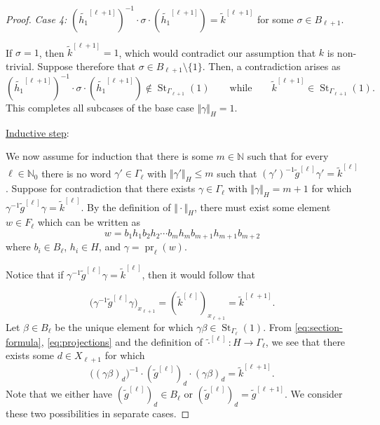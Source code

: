 \documentclass[10pt,a4paper]{amsart}
\DeclareMathOperator{\St}{St}
\DeclareMathOperator{\pr}{pr}
\newcommand{\N}{\mathbb{N}}
\newcommand{\absH}[1]{\Vert #1 \Vert_H}
\renewcommand\leq\leqslant
\begin{document}
\begin{proof}
\medskip

\noindent\textit{Case 4:}
$(\widetilde{h_1}^{[\ell+1]})^{-1}\cdot \sigma\cdot (\widetilde{h_1}^{[\ell+1]}) = \widetilde{k}^{[\ell+1]}$ for some $\sigma\in B_{\ell+1}$.

\smallskip\noindent
If $\sigma = 1$, then $\widetilde{k}^{[\ell+1]} = 1$, which would contradict our assumption that $k$ is non-trivial.
Suppose therefore that $\sigma \in B_{\ell+1}\setminus \{1\}$.
Then, a contradiction arises as
\[									 
(\widetilde{h_1}^{[\ell+1]})^{-1}\cdot \sigma\cdot (\widetilde{h_1}^{[\ell+1]})\notin \St_{\Gamma_{\ell+1}}(1)
\qquad
\text{while}
\qquad
\widetilde{k}^{[\ell+1]}\in \St_{\Gamma_{\ell+1}}(1).
\]
This completes all subcases of the base case $\absH{\gamma}=1$.

\medskip

\noindent\underline{Inductive step}:
\nopagebreak

\nopagebreak\smallskip
\nopagebreak\noindent
We now assume for induction that there is some $m\in \N$ such that for every $\ell\in\N_0$ there is no word $\gamma'\in\Gamma_\ell$ with $\absH{\gamma'}\leq m$ such that $(\gamma')^{-1} \widetilde{g}^{[\ell]} \gamma' = \widetilde{k}^{[\ell]}$.
Suppose for contradiction that there exists $\gamma\in \Gamma_\ell$ with $\absH{\gamma}=m+1$ for which $\gamma^{-1} \widetilde{g}^{[\ell]} \gamma = \widetilde{k}^{[\ell]}$.
By the definition of $\absH{\cdot}$, there must exist some element $w\in F_\ell$ which can be written as
\[
    w = b_1 h_1 b_2 h_2 \cdots b_m h_m b_{m+1} h_{m+1} b_{m+2} 
\]
where $b_i\in B_\ell$, $h_i\in H$, and $\gamma = \pr_\ell(w)$.

Notice that if $\gamma^{-1} \widetilde{g}^{[\ell]} \gamma = \widetilde{k}^{[\ell]}$, then it would follow that

\begin{equation}\label{eq:projections}
    \bigl(\gamma^{-1} \widetilde{g}^{[\ell]} \gamma\bigr)_{x_{\ell+1}}
    =
    (\widetilde{k}^{[\ell]})_{x_{\ell+1}}
    =
    \widetilde{k}^{[\ell+1]}.
\end{equation}
Let $\beta\in B_\ell$ be the unique element for which
$
    \gamma\beta\in \St_{\Gamma_\ell}(1).
$
From \eqref{eq:section-formula}, \eqref{eq:projections} and the definition of $\widetilde{\cdot}^{[\ell]}\colon H \to \Gamma_\ell$, we see that there exists some $d\in X_{\ell+1}$ for which
\begin{equation}\label{eq:projections2}
    \bigl((\gamma\beta)_{d}\bigr)^{-1}
    \cdot (\widetilde{g}^{[\ell]})_d
    \cdot (\gamma\beta)_{d}
    =
    \widetilde{k}^{[\ell+1]}.
\end{equation}
Note that we either have $(\widetilde{g}^{[\ell]})_d\in B_\ell$ or $(\widetilde{g}^{[\ell]})_d = \widetilde{g}^{[\ell+1]}$.
We consider these two possibilities in separate cases.


\end{proof}
\end{document}
